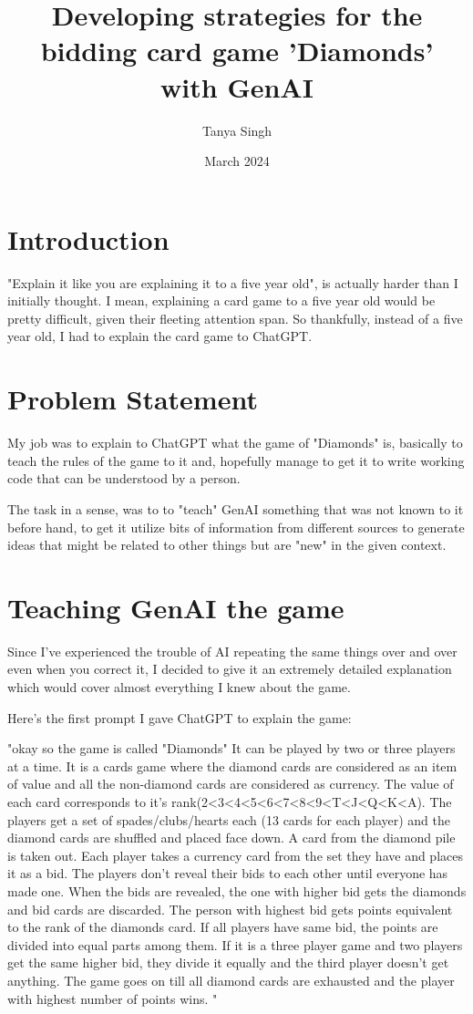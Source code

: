 \documentclass{article}
\title{Developing strategies for the bidding card game 'Diamonds' with GenAI}
\author{Tanya Singh}
\date{March 2024}
\begin{document}
\maketitle

\section{Introduction}
"Explain it like you are explaining it to a five year old", is actually harder than I initially thought. I mean, explaining a card game to a five year old would be pretty difficult, given their fleeting attention span. So thankfully, instead of a five year old, I had to explain the card game to ChatGPT.

\section{Problem Statement}
My job was to explain to ChatGPT what the game of "Diamonds" is, basically to teach the rules of the game to it and, hopefully manage to get it to write working code that can be understood by a person.

The task in a sense, was to to "teach" GenAI something that was not known to it before hand, to get it utilize bits of information from different sources to generate ideas that might be related to other things but are "new" in the given context. 


\section{Teaching GenAI the game}
Since I've experienced the trouble of AI repeating the same things over and over even when you correct it, I decided to give it an extremely detailed explanation which would cover almost everything I knew about the game.

Here's the first prompt I gave ChatGPT to explain the game:

"okay so the game is called "Diamonds" It can be played by two or three players at a time. 
It is a cards game where the diamond cards are considered as an item of value and all the non-diamond cards are considered as currency. 
The value of each card corresponds to it's rank(2<3<4<5<6<7<8<9<T<J<Q<K<A). 
The players get a set of spades/clubs/hearts each (13 cards for each player) and the diamond cards are shuffled and placed face down. 
A card from the diamond pile is taken out. Each player takes a currency card from the set they have and places it as a bid. 
The players don't reveal their bids to each other until everyone has made one. When the bids are revealed, the one with higher bid gets the diamonds and bid cards are discarded. 
The person with highest bid gets points equivalent to the rank of the diamonds card. If all players have same bid, the points are divided into equal parts among them. 
If it is a three player game and two players get the same higher bid, they divide it equally and the third player doesn't get anything. 
The game goes on till all diamond cards are exhausted and the player with highest number of points wins.
"
\end{document}

